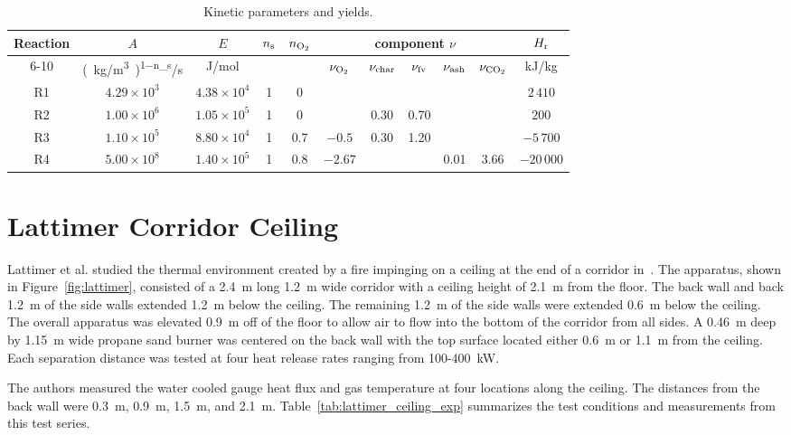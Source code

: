 \begin{table}[h]
\centering
\caption[Kinetic parameters and yields]{Kinetic parameters and yields.}
\small
\renewcommand{\arraystretch}{1.2}
\begin{tabular}{|c|c|c|c|c|c|c|c|c|c|c|}
\hline
Reaction  & $A$ & $E$ & $n_{\rm s}$ & $n_{{\rm O}_2}$ & \multicolumn{5}{c}{component $\nu$} & $H_{\rm r}$ \\ 
\cline{6-10}
  & \unit{(kg/m^3)^{1-n_s}/s} & J/mol & & & $\nu_{{\rm O}_2}$ & $\nu_{\rm char}$ & $\nu_{\rm fv}$ & $\nu_{\rm ash}$ & $\nu_{{\rm C}{\rm O}_2}$ & kJ/kg\\
\hline
R1  & $4.29\times 10^3$ & $4.38\times 10^4$ & 1  & 0    &          &       &       &      &      & $2\,410$   \\
R2  & $1.00\times 10^6$ & $1.05\times 10^5$ & 1  & 0    &          & 0.30  & 0.70  &      &      & $200$      \\
R3  & $1.10\times 10^5$ & $8.80\times 10^4$ & 1  & 0.7  & $-0.5$   & 0.30  & 1.20  &      &      & $-5\,700$  \\
R4  & $5.00\times 10^8$ & $1.40\times 10^5$ & 1  & 0.8  & $-2.67$  &       &       & 0.01 & 3.66 & $-20\,000$ \\
\hline
\end{tabular}
\label{tab:m1_kinetics}
\end{table}


\section{Lattimer Corridor Ceiling}
\label{Lattimer_Corridor_Ceiling_Description}

Lattimer et al. studied the thermal environment created by a fire impinging on a ceiling at the end of a corridor in~\cite{Lattimer:FTJ:2013}. The apparatus, shown in Figure~\ref{fig:lattimer}, consisted of a 2.4~m long 1.2~m wide corridor with a ceiling height of 2.1~m from the floor. The back wall and back 1.2~m of the side walls extended 1.2~m below the ceiling. The remaining 1.2~m of the side walls were extended 0.6~m below the ceiling. The overall apparatus was elevated 0.9~m off of the floor to allow air to flow into the bottom of the corridor from all sides. A 0.46~m deep by 1.15~m wide propane sand burner was centered on the back wall with the top surface located either 0.6~m or 1.1~m from the ceiling. Each separation distance was tested at four heat release rates ranging from 100-400~kW.

The authors measured the water cooled gauge heat flux and gas temperature at four locations along the ceiling. The distances from the back wall were 0.3~m, 0.9~m, 1.5~m, and 2.1~m. Table~\ref{tab:lattimer_ceiling_exp} summarizes the test conditions and measurements from this test series.

